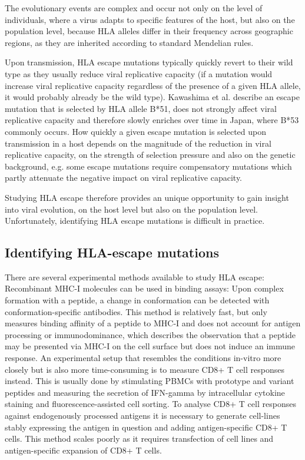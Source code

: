 \documentclass[fleqn,11pt]{SelfArx} %
\begin{document}
The evolutionary events are complex and occur not only on the level of individuals, 
where a virus adapts to specific features of the host, but also on the population level,
because HLA alleles differ in their frequency across geographic regions, as they are inherited
according to standard Mendelian rules.

Upon transmission, HLA escape mutations typically quickly revert to their wild type
as they usually reduce viral replicative capacity (if a mutation would increase
viral replicative capacity regardless of the presence of a given HLA allele, it would
probably already be the wild type). Kawashima et al.
describe an escape mutation that is selected by HLA allele B*51,
does not strongly affect viral replicative capacity and therefore slowly enriches
over time in Japan, where B*53 commonly occurs.
How quickly a given escape mutation is selected upon transmission in a host depends on the
magnitude of the reduction in viral replicative capacity, on the strength of selection
pressure and also on the genetic background, e.g. some escape mutations require compensatory 
mutations which partly attenuate the negative impact on viral replicative capacity.

Studying HLA escape therefore provides an unique opportunity to gain insight into
viral evolution, on the host level but also on the population level.
Unfortunately, identifying HLA escape mutations is difficult in practice.

\subsection{Identifying HLA-escape mutations}

There are several experimental methods available to study HLA escape:
Recombinant MHC-I molecules can be used in binding assays: Upon complex formation
with a peptide, a change in conformation can be detected with conformation-specific
antibodies. This method is relatively fast, but only measures binding affinity of a
peptide to MHC-I and does not account for antigen processing or immunodominance, 
which describes the observation that a peptide may be presented via MHC-I on the cell 
surface but does not induce an immune response.
An experimental setup that resembles the conditions in-vitro more closely but is also
more time-consuming is to measure
CD8+ T cell responses instead. This is usually done by stimulating PBMCs with prototype
and variant peptides and measuring the secretion of IFN-gamma by intracellular cytokine
staining and fluorescence-assisted cell sorting.
To analyse CD8+ T cell responses against endogenously processed antigens it is necessary
to generate cell-lines stably expressing the antigen in question and adding antigen-specific
CD8+ T cells. This method scales poorly as it requires transfection of cell lines and
antigen-specific expansion of CD8+ T cells.
\end{document}
